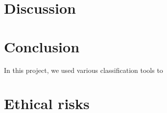 \documentclass[10pt,conference,compsocconf]{IEEEtran}
\begin{document}
\section{Discussion}
\label{sec:discussion}

\section{Conclusion}
\label{sec:conclusion}
In this project, we used various classification tools to

\newpage
\section{Ethical risks}


\end{document}
